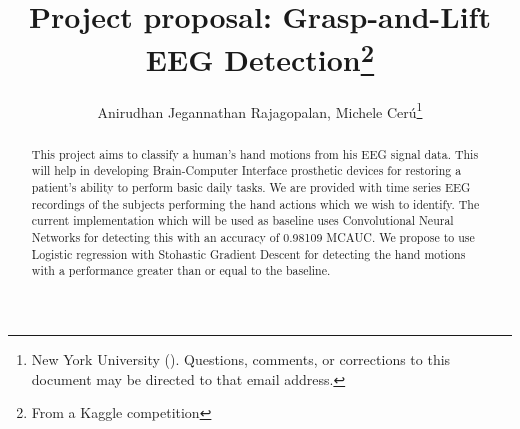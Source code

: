 \documentclass[final,leqno,onefignum,onetabnum]{siamltexmm}
\title{Project proposal: Grasp-and-Lift EEG Detection\thanks{From a Kaggle competition}}
\author{Anirudhan Jegannathan Rajagopalan, Michele Cer\'u\thanks{New York University (\email{ajr619@nyu.edu; mc3784@nyu.edu}). Questions, comments, or corrections
to this document may be directed to that email address.}}
\begin{document}
\maketitle
\newcommand{\slugmaster}{%
\slugger{siads}{xxxx}{xx}{x}{x---x}}%

  \begin{abstract}
    This project aims to classify a human's hand motions from his EEG signal data.  This will help in developing Brain-Computer Interface prosthetic devices for restoring a patient's ability to perform basic daily tasks.
    We are provided with time series EEG recordings of the subjects performing the hand actions which we wish to identify.
    The current implementation which will be used as baseline uses Convolutional Neural Networks for detecting this with an accuracy of 0.98109 MCAUC\@.  
    We propose to use Logistic regression with Stohastic Gradient Descent for detecting the hand motions with a performance greater than or equal to the baseline.
  \end{abstract}

  \pagestyle{myheadings}
  \thispagestyle{plain}
\end{document}
